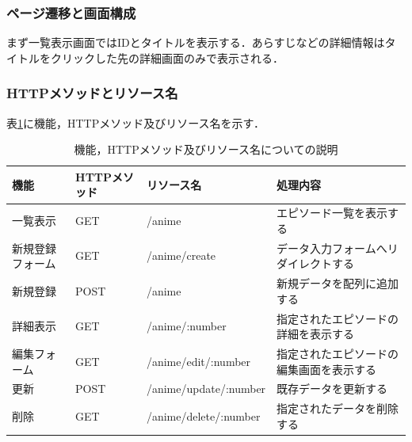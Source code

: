 \documentclass[uplatex,dvipdfmx]{jlreq}
\begin{document}
\subsubsection{ページ遷移と画面構成}
まず一覧表示画面ではIDとタイトルを表示する．あらすじなどの詳細情報はタイトルをクリックした先の詳細画面のみで表示される．

\subsubsection{HTTPメソッドとリソース名}
表\ref{tb:story2}に機能，HTTPメソッド及びリソース名を示す．

\begin{table}[htbp]
  \centering
  \begin{tabularx}{\textwidth}{|l|l|l|X|} \hline
    機能 & HTTPメソッド & リソース名 & 処理内容 \\ \hline\hline
    一覧表示 & GET & /anime & エピソード一覧を表示する \\ \hline
    新規登録フォーム & GET & /anime/create & データ入力フォームへリダイレクトする \\ \hline
    新規登録 & POST & /anime & 新規データを配列に追加する \\ \hline
    詳細表示 & GET & /anime/:number & 指定されたエピソードの詳細を表示する \\ \hline
    編集フォーム & GET & /anime/edit/:number & 指定されたエピソードの編集画面を表示する \\ \hline
    更新 & POST & /anime/update/:number & 既存データを更新する \\ \hline
    削除 & GET & /anime/delete/:number & 指定されたデータを削除する \\ \hline
  \end{tabularx}
  \caption{機能，HTTPメソッド及びリソース名についての説明}
  \label{tb:story2}
\end{table}
\end{document}

